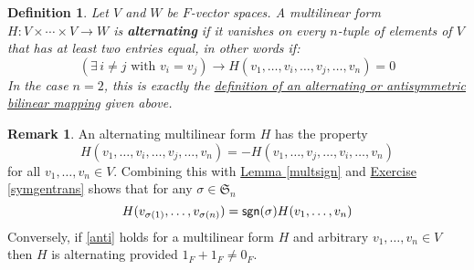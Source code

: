 \documentclass[11pt]{amsbook}
\newtheorem{definition}[theorem]{Definition}
\theoremstyle{definition}
\newtheorem{rem}[theorem]{Remark}
\begin{document}
\begin{definition}
Let $V$ and $W$ be $F$-vector spaces. A multilinear form $H: V\times \cdots \times V\to W$ is {\bf alternating} if it vanishes on every $n$-tuple of elements of $V$ that has at least two entries equal, in other words if:
$$ (\exists \, i\neq j \text{ with }v_i=v_j) \to H(v_1, \ldots , v_i, \ldots , v_j, \ldots , v_n) = 0$$
In the case $n=2$, this is exactly the \hyperref[bilindef]{definition of an alternating or antisymmetric bilinear mapping} given above.
\end{definition}

\begin{rem} \label{altdesc} An alternating multilinear form $H$ has the property \begin{equation} \label{anti} H (v_1,  \ldots , v_i, \ldots , v_j, \ldots , v_n) = - H ( v_1, \ldots , v_j, \ldots , v_i, \ldots , v_n)\end{equation}  for all $v_1, \ldots , v_n \in V$. Combining this with \hyperref[multsign]{Lemma \ref{multsign}} and \hyperref[transodd]{Exercise \ref{symgentrans}} shows that for any $\sigma \in \mathfrak{S}_n$ $$H (v_{\sigma(1)},  \ldots , v_{\sigma(n)}) = {\sf sgn}(\sigma) H ( v_1,  \ldots , v_n)$$ Conversely, if \eqref{anti} holds for a multilinear form  $H$ and arbitrary $v_1, \ldots , v_n \in V$ then $H$ is alternating provided $1_F + 1_F \neq 0_F$.
\end{rem}
\end{document}

